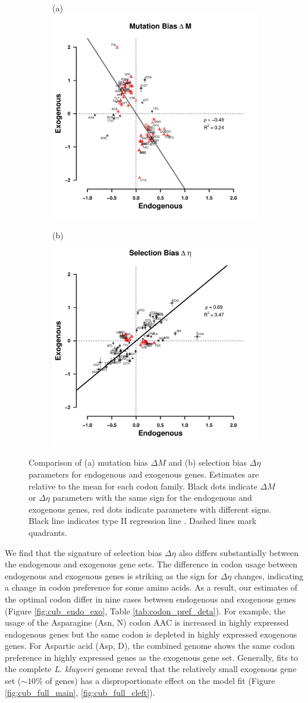 \documentclass[doublespacing,linenumbers]{bmcart-modified}
\newcommand{\kluyveri}{\textit{L. kluyveri}\xspace}
\newcommand{\DM}{\ensuremath{{\Delta M}}\xspace}
\newcommand{\DE}{\ensuremath{{\Delta \eta}}\xspace}
\begin{document}
\begin{figure}
    \centering
    \begin{subfigure}
        \centering
        (a) \includegraphics[width=.45\textwidth]{img/fig2a.pdf}%
    \end{subfigure}
    \begin{subfigure}
        \centering
        (b) \includegraphics[width=.45\textwidth]{img/fig2b.pdf}%
    \end{subfigure}
    \caption{Comparison of (a) mutation bias \DM and (b) selection bias \DE parameters for endogenous and exogenous genes.
      Estimates are relative to the mean for each codon family.
      Black dots indicate \DM or \DE parameters with the same sign for the endogenous and exogenous genes, red dots indicate parameters with different signs.
      Black line indicates type II regression line \citep{SokalAndRohlf1981}.
      Dashed lines mark quadrants.}
    \label{fig:csp_comp}
\end{figure}


We find that the signature of selection bias \DE also differs substantially between the endogenous and exogenous gene sets.
The difference in codon usage between endogenous and exogenous genes is striking as the sign for \DE changes, indicating a change in codon preference for some amino acids.
As a result, our estimates of the optimal codon differ in nine cases between endogenous and exogenous genes (Figure \ref{fig:cub_endo_exo}, Table \ref{tab:codon_pref_deta}).
For example, the usage of the Asparagine (Asn, N) codon AAC is increased in highly expressed endogenous genes but the same codon is depleted in highly expressed exogenous genes.
For Aspartic acid (Asp, D), the combined genome shows the same codon preference in highly expressed genes as the exogenous gene set.
Generally, fits to the complete \kluyveri genome reveal that the relatively small exogenous gene set ($\sim 10\%$ of genes) has a disproportionate effect on the model fit (Figure \ref{fig:cub_full_main}, \ref{fig:cub_full_cleft}).
\end{document}
